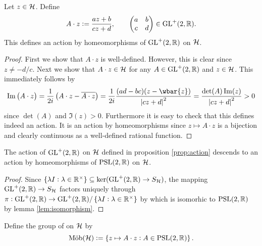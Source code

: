 \begin{proposition}
	Let $z \in \mathcal{H}$. Define 
	\begin{equation}
		A \cdot z := \frac{az + b}{cz + d}, \qquad \begin{pmatrix}
			a & b\\
			c & d
		\end{pmatrix} \in \mathrm{GL}^+(2,\mathbb{R}).
	\end{equation}
	This defines an action by homeomorphisms of $\mathrm{GL}^+(2,\mathbb{R})$ on $\mathcal{H}$.
	\label{prop:action}
\end{proposition}

\begin{proof}
	First we show that $A \cdot z$ is well-defined. However, this is clear since $z \neq -d/c$. Next we show that $A \cdot z \in \mathcal{H}$ for any $A \in \mathrm{GL}^+(2,\mathbb{R})$ and $z \in \mathcal{H}$. This immediately follows by
	\begin{equation}
\Im\del[1]{A \cdot z} = \frac{1}{2i}\del[1]{A \cdot z - \overline{A \cdot z}} = \frac{1}{2i}\frac{(ad - bc)(z - \wbar{z})}{\abs[0]{cz + d}^2} = \frac{\det(A)\Im(z)}{\abs[0]{cz + d}^2} > 0
		\label{eq:imaginary_part}
	\end{equation}
	\noindent since $\det(A)$ and $\Im(z) > 0$. Furthermore it is easy to check that this defines indeed an action. It is an action by homeomorphisms since $z \mapsto A \cdot z$ is a bijection and clearly continuous as a well-defined rational function. 
\end{proof}

\begin{corollary}
	The action of $\mathrm{GL}^+(2,\mathbb{R})$ on $\mathcal{H}$ defined in proposition \ref{prop:action} descends to an action by homeomorphisms of $\mathrm{PSL}(2,\mathbb{R})$ on $\mathcal{H}$.
\end{corollary}

\begin{proof}
	Since $\cbr[0]{\lambda I : \lambda \in \Rbb^\times} \subseteq \ker(\GLrm^+(2,\Rbb) \to S_\Hcal)$, the mapping $\mathrm{GL}^+(2,\mathbb{R}) \to S_{\mathcal{H}}$ factors uniquely through $\pi : \GLrm^+(2,\Rbb) \to \GLrm^+(2,\Rbb)/\cbr[0]{\lambda I : \lambda \in \Rbb^\times}$ by \cite[23]{grillet:abstract_algebra:2007} which is isomorhic to $\mathrm{PSL}(2,\mathbb{R})$ by lemma \ref{lem:isomorphism}.	
\end{proof}

\begin{definition}
	Define the group of  on $\mathcal{H}$ by
	\begin{equation}
		\Mob(\Hcal) := \cbr[0]{z \mapsto A \cdot z : A \in \PSLrm(2,\Rbb)}.
	\end{equation}
\end{definition}

